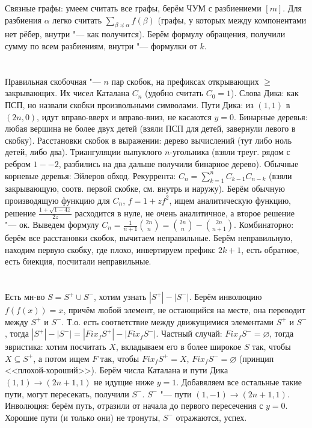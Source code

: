 Связные графы: умеем считать все графы, берём ЧУМ с разбиениеми $[m]$.
Для разбиения $\alpha$ легко считать $\sum_{\beta \preccurlyeq \alpha} f(\beta)$ (графы, у которых между компонентами
нет рёбер, внутри "--- как получится).
Берём формулу обращения, получили сумму по всем разбиениям, внутри "--- формулки от $k$.

\section{} %
Правильная скобочная "--- $n$ пар скобок, на префиксах открывающих $\ge$ закрывающих.
Их чисел Каталана $C_n$ (удобно считать $C_0=1$).
Слова Дика: как ПСП, но назвали скобки произвольными символами.
Пути Дика: из $(1,1)$ в $(2n,0)$, идут вправо-вверх и вправо-вниз, не касаются $y=0$.
Бинарные деревья: любая вершина не более двух детей (взяли ПСП для детей, завернули левого в скобку).
Расстановки скобок в выражении: дерево вычислений (тут либо ноль детей, либо два).
Триангуляции выпуклого $n$-угольника (взяли треуг. рядом с ребром $1--2$, разбились на два дальше получили бинарное дерево).
Обычные корневые деревья: Эйлеров обход.
Рекуррента: $C_n = \sum_{k=1}^n C_{k-1}C_{n-k}$ (взяли закрывающую, соотв. первой скобке, см. внутрь и наружу).
Берём обычную производящую функцию для $C_n$, $f=1+zf^2$, ищем аналитическую функцию, решение $\frac{1+\sqrt{1-4z}}{2z}$ расходится в нуле,
не очень аналитичное, а второе решение "--- ок.
Выведем формулу $C_n=\frac{1}{n+1}\binom{2n}{n}=\binom{2n}{n}-\binom{2n}{n+1}$.
Комбинаторно: берём все расстановки скобок, вычитаем неправильные.
Берём неправильную, находим первую скобку, где плохо, инвертируем префикс $2k+1$,
есть обратное, есть биекция, посчитали неправильные.

\section{} %
Есть мн-во $S=S^+ \cup S^-$, хотим узнать $|S^+|-|S^-|$.
Берём инволюцию $f(f(x))=x$, причём любой элемент, не остающийся на месте,
она переводит между $S^+$ и $S^-$.
Т.о. есть соответствие между движущимися элементами $S^+$ и $S^-$, тогда $|S^+|-|S^-| = |Fix_f S^+| - |Fix_f S^-|$.
Частный случай: $Fix_f S^- = \varnothing$, тогда эвристика: хотим посчитать $X$,
вкладываем его в более широкое $S$ так, чтобы $X \subseteq S^+$, а потом ищем $F$ так,
чтобы $Fix_f S^+=X$, $Fix_f S^-=\varnothing$ (принцип <<плохой-хороший>>).
Берём числа Каталана и пути Дика $(1,1)\to(2n+1,1)$ не идущие ниже $y=1$.
Добавяляем все остальные такие пути, могут пересекать, получили $S^-$.
$S^-$ "--- пути $(1, -1)\to(2n+1,1)$.
Инволюция: берём путь, отразили от начала до первого пересечения с $y=0$.
Хорошие пути (и только они) не тронуты, $S^-$ отражаются, успех.

